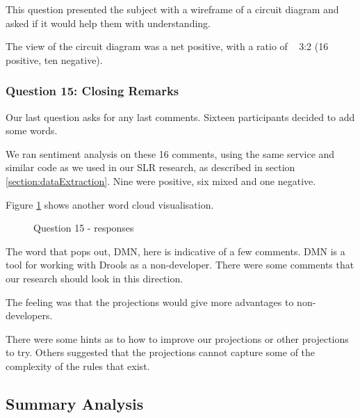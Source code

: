 This question presented the subject with a wireframe of a circuit diagram and asked if it would help them with understanding.

The view of the circuit diagram was a net positive, with a ratio of ~ 3:2 (16 positive, ten negative).

\subsubsection{Question 15: Closing Remarks}

Our last question asks for any last comments.
Sixteen participants decided to add some words.

We ran sentiment analysis on these 16 comments, using the same service and similar code as we used in our SLR research, as described in section \ref{section:dataExtraction}.
Nine were positive, six mixed and one negative.

Figure \ref{fig:Q15_wordcloud} shows another word cloud visualisation.

\begin{figure}
    \centering
    \caption{Question 15 - responses}
    \label{fig:Q15_wordcloud}
\end{figure}

The word that pops out, DMN, here is indicative of a few comments.
DMN is a tool for working with Drools as a non-developer.
There were some comments that our research should look in this direction.

The feeling was that the projections would give more advantages to non-developers.

There were some hints as to how to improve our projections or other projections to try.
Others suggested that the projections cannot capture some of the complexity of the rules that exist.

\subsection{Summary Analysis}

